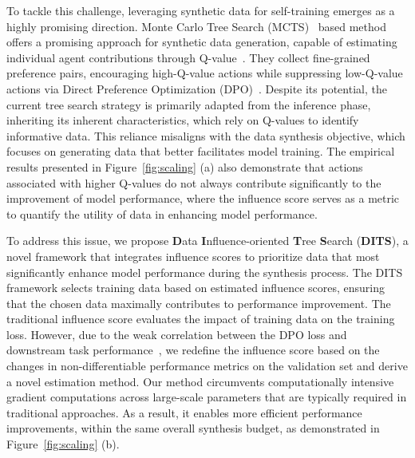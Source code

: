% 
To tackle this challenge, leveraging synthetic data for self-training emerges as a highly promising direction. Monte Carlo Tree Search (MCTS)~\cite{guan2025rstarmathsmallllmsmaster, li2025enhancingreasoningprocesssupervision} based method offers a promising approach for synthetic data generation, capable of estimating individual agent contributions through Q-value~\cite{DBLP:journals/corr/abs-2410-08115}. They collect fine-grained preference pairs, encouraging high-Q-value actions while suppressing low-Q-value actions via Direct Preference Optimization (DPO)~\cite{DBLP:conf/nips/RafailovSMMEF23}. 
Despite its potential, the current tree search strategy is primarily adapted from the inference phase, inheriting its inherent characteristics, which rely on Q-values to identify informative data. This reliance misaligns with the data synthesis objective, which focuses on generating data that better facilitates model training. The empirical results presented in Figure~\ref{fig:scaling} (a) also demonstrate that actions associated with higher Q-values do not always contribute significantly to the improvement of model performance, where the influence score serves as a metric to quantify the utility of data in enhancing model performance.


To address this issue, we propose \textbf{D}ata \textbf{I}nfluence-oriented \textbf{T}ree \textbf{S}earch (\textbf{DITS}), a novel framework that integrates influence scores to prioritize data that most significantly enhance model performance during the synthesis process. The DITS framework selects training data based on estimated influence scores, ensuring that the chosen data maximally contributes to performance improvement.
The traditional influence score evaluates the impact of training data on the training loss. However, due to the weak correlation between the DPO loss and downstream task performance~\cite{DBLP:journals/corr/abs-2406-02900, DBLP:journals/corr/abs-2410-11677}, we redefine the influence score based on the changes in non-differentiable performance metrics on the validation set and derive a novel estimation method. Our method circumvents computationally intensive gradient computations across large-scale parameters that are typically required in traditional approaches. As a result, it enables more efficient performance improvements, within the same overall synthesis budget, as demonstrated in Figure~\ref{fig:scaling} (b).


